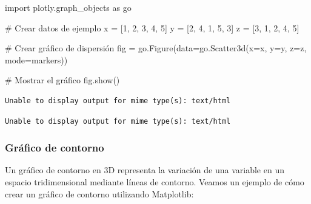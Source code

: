 \documentclass[
  a4paper,
]{article}
\newenvironment{Shaded}{}{}
\newcommand{\CommentTok}[1]{\textcolor[rgb]{0.42,0.45,0.49}{#1}}
\newcommand{\DecValTok}[1]{\textcolor[rgb]{0.00,0.36,0.77}{#1}}
\newcommand{\ImportTok}[1]{\textcolor[rgb]{0.01,0.18,0.38}{#1}}
\newcommand{\NormalTok}[1]{\textcolor[rgb]{0.14,0.16,0.18}{#1}}
\newcommand{\OperatorTok}[1]{\textcolor[rgb]{0.14,0.16,0.18}{#1}}
\newcommand{\StringTok}[1]{\textcolor[rgb]{0.01,0.18,0.38}{#1}}
\begin{document}
\begin{Shaded}
\begin{Highlighting}[]
\ImportTok{import}\NormalTok{ plotly.graph\_objects }\ImportTok{as}\NormalTok{ go}

\CommentTok{\# Crear datos de ejemplo}
\NormalTok{x }\OperatorTok{=}\NormalTok{ [}\DecValTok{1}\NormalTok{, }\DecValTok{2}\NormalTok{, }\DecValTok{3}\NormalTok{, }\DecValTok{4}\NormalTok{, }\DecValTok{5}\NormalTok{]}
\NormalTok{y }\OperatorTok{=}\NormalTok{ [}\DecValTok{2}\NormalTok{, }\DecValTok{4}\NormalTok{, }\DecValTok{1}\NormalTok{, }\DecValTok{5}\NormalTok{, }\DecValTok{3}\NormalTok{]}
\NormalTok{z }\OperatorTok{=}\NormalTok{ [}\DecValTok{3}\NormalTok{, }\DecValTok{1}\NormalTok{, }\DecValTok{2}\NormalTok{, }\DecValTok{4}\NormalTok{, }\DecValTok{5}\NormalTok{]}

\CommentTok{\# Crear gráfico de dispersión}
\NormalTok{fig }\OperatorTok{=}\NormalTok{ go.Figure(data}\OperatorTok{=}\NormalTok{go.Scatter3d(x}\OperatorTok{=}\NormalTok{x, y}\OperatorTok{=}\NormalTok{y, z}\OperatorTok{=}\NormalTok{z, mode}\OperatorTok{=}\StringTok{\textquotesingle{}markers\textquotesingle{}}\NormalTok{))}

\CommentTok{\# Mostrar el gráfico}
\NormalTok{fig.show()}
\end{Highlighting}
\end{Shaded}

\begin{verbatim}
Unable to display output for mime type(s): text/html
\end{verbatim}

\begin{verbatim}
Unable to display output for mime type(s): text/html
\end{verbatim}

\hypertarget{gruxe1fico-de-contorno}{%
\subsubsection{Gráfico de contorno}\label{gruxe1fico-de-contorno}}

Un gráfico de contorno en 3D representa la variación de una variable en
un espacio tridimensional mediante líneas de contorno. Veamos un ejemplo
de cómo crear un gráfico de contorno utilizando Matplotlib:
\end{document}
